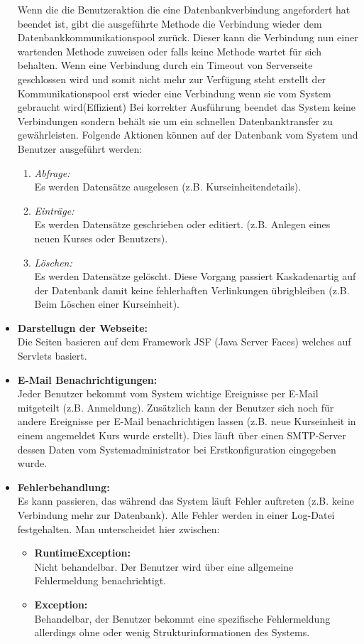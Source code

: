 \begin{itemize}
			Wenn die die Benutzeraktion die eine Datenbankverbindung angefordert hat beendet ist, gibt die ausgeführte Methode die Verbindung wieder dem Datenbankkommunikationspool zurück. Dieser kann die Verbindung nun einer wartenden Methode zuweisen oder falls keine Methode wartet für sich behalten. Wenn eine Verbindung durch ein Timeout von Serverseite geschlossen wird und somit nicht mehr zur Verfügung steht erstellt der Kommunikationspool erst wieder eine Verbindung wenn sie vom System gebraucht wird(Effizient) Bei korrekter Ausführung beendet das System keine Verbindungen sondern behält sie um ein schnellen Datenbanktransfer zu gewährleisten. Folgende Aktionen können auf der Datenbank vom System und Benutzer ausgeführt werden:
			\begin{enumerate}
				\item \emph{Abfrage:} \\
				Es werden Datensätze ausgelesen (z.B. Kurseinheitendetails).
				\item \emph{Einträge:}\\
				 Es werden Datensätze geschrieben oder editiert. (z.B. Anlegen eines neuen Kurses oder Benutzers).
				\item \emph{Löschen:} \\
				Es werden Datensätze gelöscht. Diese Vorgang passiert Kaskadenartig auf der Datenbank damit keine fehlerhaften Verlinkungen übrigbleiben (z.B. Beim Löschen einer Kurseinheit).
				
			\end{enumerate}
			
			\item \textbf{Darstellugn der Webseite:} \\
			Die Seiten basieren auf dem Framework JSF (Java Server Faces) welches auf Servlets basiert. 
			
			\item \textbf{E-Mail Benachrichtigungen:}\\
			 Jeder Benutzer bekommt vom System wichtige Ereignisse per E-Mail mitgeteilt (z.B. Anmeldung). Zusätzlich kann der Benutzer sich noch für andere Ereignisse per E-Mail benachrichtigen lassen (z.B. neue Kurseinheit in einem angemeldet Kurs wurde erstellt). Dies läuft über einen SMTP-Server dessen Daten vom Systemadministrator bei Erstkonfiguration eingegeben wurde.
			
			\item \textbf{Fehlerbehandlung:} \\
			Es kann passieren, das während das System läuft Fehler auftreten (z.B. keine Verbindung mehr zur Datenbank). Alle Fehler werden in einer Log-Datei festgehalten. Man unterscheidet hier zwischen:
			\begin{itemize}
				\item \textbf{RuntimeException:}\\
				 Nicht behandelbar. Der Benutzer wird über eine allgemeine Fehlermeldung benachrichtigt.
				\item \textbf{Exception:} \\
				Behandelbar, der Benutzer bekommt eine spezifische Fehlermeldung allerdings ohne oder wenig Strukturinformationen des Systems.
				\end{itemize}
			

\end{itemize}
